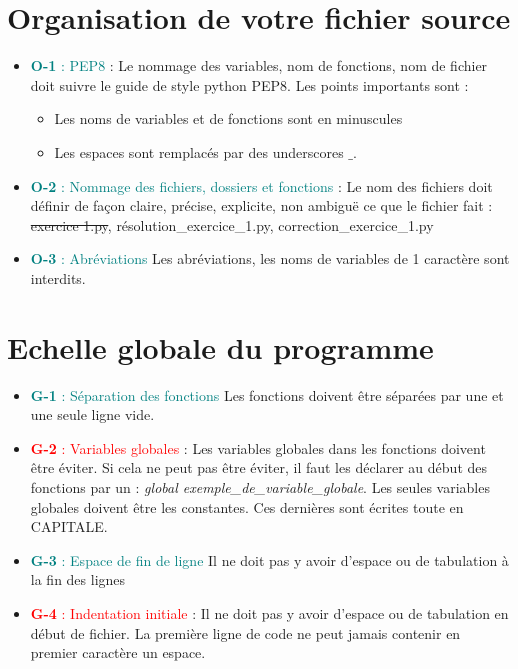 \documentclass[12pt,fleqn]{report}
\begin{document}
\section{Organisation de votre fichier source}
\begin{itemize}
    \item \textcolor{teal}{\textbf{O-1} : PEP8} : Le nommage des variables, nom de fonctions, nom de fichier doit suivre le guide de style python PEP8. Les points importants sont : 
    \begin{itemize}
        \item Les noms de variables et de fonctions sont en minuscules
        \item Les espaces sont remplacés par des underscores $\_$.
    \end{itemize}
    \item \textcolor{teal}{\textbf{O-2} : Nommage des fichiers, dossiers et fonctions} : Le nom des fichiers doit définir de façon claire, précise, explicite, non ambiguë ce que le fichier fait : \sout{exercice 1.py}, résolution\_exercice\_1.py, correction\_exercice\_1.py
    \item\textcolor{teal}{\textbf{O-3} : Abréviations} Les abréviations, les noms de variables de 1 caractère sont interdits.    
\end{itemize}

\section{Echelle globale du programme}
\begin{itemize}
    \item \textcolor{teal}{\textbf{G-1} : Séparation des fonctions} Les fonctions doivent être séparées par une et une seule ligne vide.
    \item \textcolor{red}{\textbf{G-2} : Variables globales} : Les variables globales dans les fonctions doivent être éviter.  Si cela ne peut pas être éviter, il faut les déclarer au début des fonctions par un : \textit{global exemple\_de\_variable\_globale}.
    Les seules variables globales doivent être les constantes. Ces dernières sont écrites toute en CAPITALE.
    \item \textcolor{teal}{\textbf{G-3} : Espace de fin de ligne} Il ne doit pas y avoir d'espace ou de tabulation à la fin des lignes
    \item \textcolor{red}{\textbf{G-4} : Indentation initiale} : Il ne doit pas y avoir d'espace ou de tabulation en début de fichier. La première ligne de code ne peut jamais contenir en premier caractère un espace.
\end{itemize}
\end{document}
